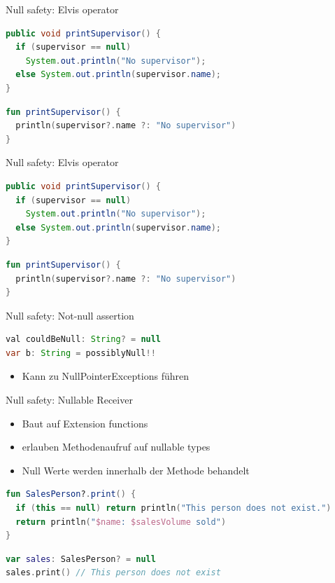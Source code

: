 \documentclass{beamer}
\begin{document}
\begin{frame}[fragile]{Null safety: Elvis operator}
  \begin{lstlisting}[language=Java]
public void printSupervisor() {
  if (supervisor == null)
    System.out.println("No supervisor");
  else System.out.println(supervisor.name);
}   
  \end{lstlisting}
  \begin{lstlisting}[language=Kotlin]
fun printSupervisor() {
  println(supervisor?.name ?: "No supervisor")
}
  \end{lstlisting}
\end{frame}

\begin{frame}[fragile]{Null safety: Elvis operator}
  \begin{lstlisting}[language=Java]
public void printSupervisor() {
  if (supervisor == null)
    System.out.println("No supervisor");
  else System.out.println(supervisor.name);
}   
  \end{lstlisting}
  \begin{lstlisting}[language=Kotlin]
fun printSupervisor() {
  println(supervisor?.name ?: "No supervisor")
}
  \end{lstlisting}
\end{frame}

\begin{frame}[fragile]{Null safety: Not-null assertion}
  \begin{lstlisting}[language=Java]
val couldBeNull: String? = null
var b: String = possiblyNull!!
  \end{lstlisting}
  \begin{itemize}
    \item Kann zu NullPointerExceptions führen
  \end{itemize}
\end{frame}

\begin{frame}[fragile]{Null safety: Nullable Receiver}
  \begin{itemize}
    \item Baut auf Extension functions
    \item erlauben Methodenaufruf auf nullable types
    \item Null Werte werden innerhalb der Methode behandelt
  \end{itemize}
  \begin{lstlisting}[language=Kotlin]
fun SalesPerson?.print() {
  if (this == null) return println("This person does not exist.")
  return println("$name: $salesVolume sold")
}
  \end{lstlisting}
  \begin{lstlisting}[language=Kotlin]
var sales: SalesPerson? = null
sales.print() // This person does not exist
  \end{lstlisting}
\end{frame}

\end{document}
